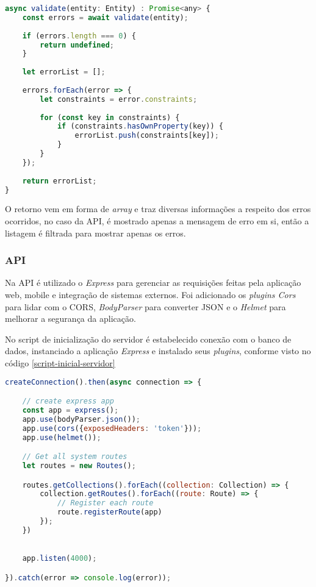 \begin{lstlisting}[language=JavaScript, caption={Validação de Objetos com o Class Validator}]
async validate(entity: Entity) : Promise<any> {
	const errors = await validate(entity);
	
	if (errors.length === 0) {
		return undefined;
	}
	
	let errorList = [];
	
	errors.forEach(error => {
		let constraints = error.constraints;
		
		for (const key in constraints) {
			if (constraints.hasOwnProperty(key)) {
				errorList.push(constraints[key]);
			}
		}
	});
	
	return errorList;
}
\end{lstlisting}

O retorno vem em forma de \textit{array} e traz diversas informações a respeito dos erros ocorridos, no caso da API, é mostrado apenas a mensagem de erro em si, então a listagem é filtrada para mostrar apenas os erros.

\subsubsection{API}
Na API é utilizado o \textit{Express} para gerenciar as requisições feitas pela aplicação web, mobile e integração de sistemas externos.
Foi adicionado os \textit{plugins Cors} para lidar com o CORS, \textit{BodyParser} para converter JSON e o \textit{Helmet} para melhorar a segurança da aplicação.

No script de inicialização do servidor é estabelecido conexão com o banco de dados, instanciado a aplicação \textit{Express} e instalado seus \textit{plugins}, conforme visto no código \ref{script-inicial-servidor}

\begin{lstlisting}[language=JavaScript, caption={Script de inicialização do servidor}, label={script-inicial-servidor}]
createConnection().then(async connection => {

	// create express app
	const app = express();
	app.use(bodyParser.json());
	app.use(cors({exposedHeaders: 'token'}));
	app.use(helmet());

	// Get all system routes
	let routes = new Routes();

	routes.getCollections().forEach((collection: Collection) => {
		collection.getRoutes().forEach((route: Route) => {
			// Register each route
			route.registerRoute(app)
		});
	})

	
	app.listen(4000);

}).catch(error => console.log(error));
\end{lstlisting}

